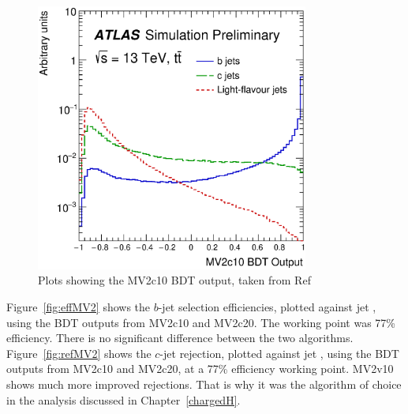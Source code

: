 \begin{figure}[!h]
\centering
   \includegraphics[width=0.8\textwidth]{figures/outputMV2_PRE.eps}
	\caption{Plots showing the MV2c10 BDT output, taken from Ref~~\cite{ATL-PHYS-PUB-2016-012}}
	\label{fig:bdtOutput}
\end{figure}

\par Figure~\ref{fig:effMV2} shows the $b$-jet selection efficiencies, plotted against 
jet \pt, using the BDT outputs from MV2c10 and MV2c20. The working point was 77\% efficiency. 
There is no significant difference between the two algorithms. Figure~\ref{fig:refMV2} shows the 
$c$-jet rejection, plotted against jet \pt, using the BDT outputs from MV2c10 and MV2c20, at a 77\% 
efficiency working point. MV2v10 shows much more improved rejections. That is why it was the 
algorithm of choice in the analysis discussed in Chapter~\ref{chargedH}.   
 
